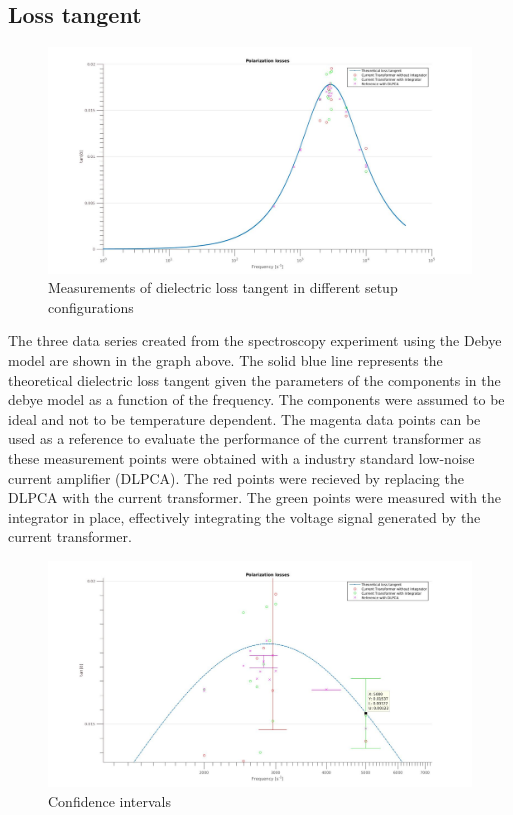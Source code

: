 \subsection{Loss tangent}
\begin{figure}[htbp]
  \centering
  \centerline{\includegraphics[scale=0.3]{figures/Results/Spectroscopy/spectroscopywithoutbars}}
  \caption[Kurze Abbildungsbeschreibung]{Measurements of dielectric loss tangent in different setup configurations}

  \label{fig.spectroscopy}

\end{figure}
The three data series created from the spectroscopy experiment using the Debye model are shown in the graph above. The solid blue line represents the theoretical  dielectric loss tangent given the parameters of the components in the debye model
as a function of the frequency.
The components were assumed to be ideal and not to be temperature dependent.
The magenta data points can be used as a reference to evaluate the performance of the current transformer as these measurement points
were obtained with a industry standard low-noise current amplifier (DLPCA). 
The red points were recieved by replacing the DLPCA with the current transformer.
The green points were measured with the integrator in place, effectively integrating the voltage signal generated by the current transformer.

\begin{figure}[htbp]
 \centering
 \centerline{\includegraphics[scale=0.3]{figures/Results/Spectroscopy/errorbarsbettercolor}}

\caption[Kurze Abbildungsbeschreibung]{Confidence intervals}
\label{fig.spectroscopy2}
\end{figure}

